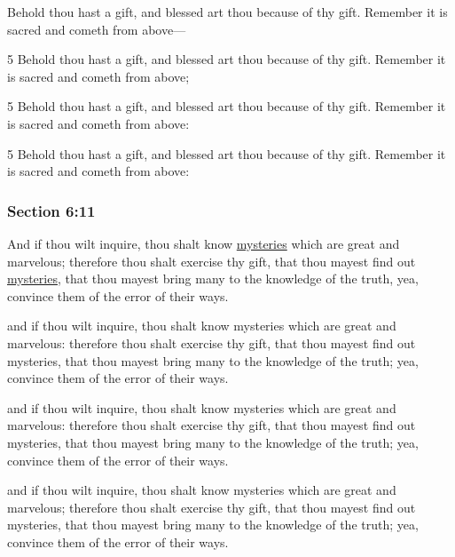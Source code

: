 		Behold thou hast a gift, and blessed art thou because of thy gift. Remember it is sacred and cometh from above---

		\begin{framed}
		\scriptsize
			\begin{compactdesc}
				\item[JSP] 5 Behold thou hast a gift, and blessed art thou because of thy gift. Remember it is sacred and cometh from above;
				\item[DC 1835] 5 Behold thou hast a gift, and blessed art thou because of thy gift. Remember it is sacred and cometh from above:
				\item[DC 1844] 5 Behold thou hast a gift, and blessed art thou because of thy gift. Remember it is sacred and cometh from above:
			\end{compactdesc}
		\end{framed}

	\subsubsection{Section 6:11} %
		\label{DC6-11}

		And if thou wilt inquire, thou shalt know \hyperref[MYSTERY]{mysteries} which are great and marvelous; therefore thou shalt exercise thy gift, that thou mayest find out \hyperref[MYSTERY]{mysteries}, that thou mayest bring many to the knowledge of the truth, yea, convince them of the error of their ways.

		\begin{framed}
		\scriptsize
			\begin{compactdesc}
				\item[JSP] and if thou wilt inquire, thou shalt know mysteries which are great and marvelous: therefore thou shalt exercise thy gift, that thou mayest find out mysteries, that thou mayest bring many to the knowledge of the truth; yea, convince them of the error of their ways. 
				\item[DC 1835] and if thou wilt inquire, thou shalt know mysteries which are great and marvelous: therefore thou shalt exercise thy gift, that thou mayest find out mysteries, that thou mayest bring many to the knowledge of the truth; yea, convince them of the error of their ways.
				\item[DC 1844] and if thou wilt inquire, thou shalt know mysteries which are great and marvelous; therefore thou shalt exercise thy gift, that thou mayest find out mysteries, that thou mayest bring many to the knowledge of the truth; yea, convince them of the error of their ways.
			\end{compactdesc}
		\end{framed}

